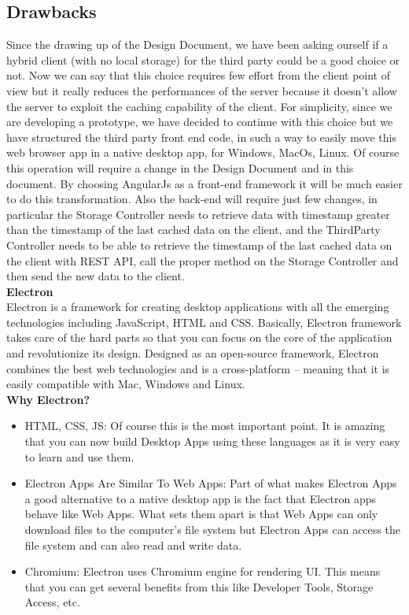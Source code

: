 \subsection{Drawbacks}
Since the drawing up of the Design Document, we have been asking ourself if a hybrid client (with no local storage) for the third party could be a good choice or not. Now we can say that this choice requires few effort from the client point of view but it really reduces the performances of the server because it doesn't allow the server to exploit the caching capability of the client.
For simplicity, since we are developing a prototype, we have decided to continue with this choice but we have structured the third party front end code, in such a way to easily move this web browser app in a native desktop app, for Windows, MacOs, Linux. Of course this operation will require a change in the Design Document and in this document.
By choosing AngularJs as a front-end framework it will be much easier to do this transformation. Also the back-end will require just few changes, in particular the Storage Controller needs to retrieve data with timestamp greater than the timestamp of the last cached data on the client, and the ThirdParty Controller needs to be able to retrieve the timestamp of the last cached data on the client with REST API, call the proper method on the Storage Controller and then send the new data to the client.\\

\textbf{Electron}\\

Electron is a framework for creating desktop applications with all the emerging technologies including JavaScript, HTML and CSS. Basically, Electron framework takes care of the hard parts so that you can focus on the core of the application and revolutionize its design.
Designed as an open-source framework, Electron combines the best web technologies and is a cross-platform – meaning that it is easily compatible with Mac, Windows and Linux.\\

\textbf{Why Electron?}
\begin{itemize}
\item HTML, CSS, JS: Of course this is the most important point. It is amazing that you can now build Desktop Apps using these languages as it is very easy to learn and use them.
\item Electron Apps Are Similar To Web Apps: Part of what makes Electron Apps a good alternative to a native desktop app is the fact that Electron apps behave like Web Apps. What sets them apart is that Web Apps can only download files to the computer’s file system but Electron Apps can access the file system and can also read and write data.
\item Chromium: Electron uses Chromium engine for rendering UI. This means that you can get several benefits from this like Developer Tools, Storage Access, etc.
\end{itemize}